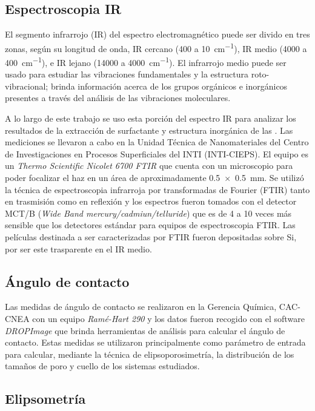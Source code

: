 	\subsection{Espectroscopia IR}\label{sec:IR}

		El segmento infrarrojo (IR) del espectro electromagnético puede ser divido en tres zonas, según su longitud de onda, IR cercano (400 a \SI{10}{\cm^{-1}}), IR medio (4000 a \SI{400}{\cm^{-1}}), e IR lejano (14000 a \SI{4000}{\cm^{-1}}). El infrarrojo medio puede ser usado para estudiar las vibraciones fundamentales y la estructura roto-vibracional; brinda información acerca de los grupos orgánicos e inorgánicos  presentes a través del análisis de las vibraciones moleculares.\cite{Atkins2006,Barrow1962,Stuart2004} 
		
		A lo largo de este trabajo se uso esta porción del espectro IR para analizar los resultados de la extracción de surfactante y estructura inorgánica de las \pdm. Las mediciones se llevaron a cabo en la Unidad Técnica de Nanomateriales del Centro de Investigaciones en Procesos Superficiales del INTI (INTI-CIEPS). El equipo es un \textit{Thermo Scientific Nicolet 6700 FTIR} que cuenta con un microscopio para poder focalizar el haz en un área de aproximadamente \SI{0.5x0.5}{\mm}. Se utilizó la técnica de espectroscopia infrarroja por transformadas de Fourier (FTIR) tanto en trasmisión como en reflexión y los espectros fueron tomados con el detector MCT/B (\textit{Wide Band mercury/cadmiun/telluride}) que es de 4 a 10 veces más sensible que los detectores estándar para equipos de espectroscopia FTIR.\cite{Nicholet2007} Las películas destinada a ser caracterizadas por FTIR fueron depositadas sobre Si, por ser este trasparente en el IR medio.

	\subsection{Ángulo de contacto}

		Las medidas de ángulo de contacto se realizaron en la Gerencia Química, CAC-CNEA con un equipo \textit{Ramé-Hart 290} y los datos fueron recogido con el software \textit{DROPImage} que brinda herramientas de análisis para calcular el ángulo de contacto. Estas medidas se utilizaron principalmente como parámetro de entrada para calcular, mediante la técnica de elipsoporosimetría, la distribución de los tamaños de poro y cuello de los sistemas estudiados.\cite{Boissiere2005}

	\subsection{Elipsometría}\label{sec:elipso}

